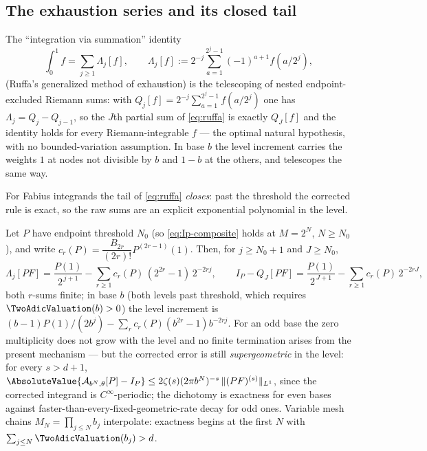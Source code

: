 \subsection{The exhaustion series and its closed tail}

The ``integration via summation'' identity
\begin{equation}
 \int_0^1f=\sum_{j\ge1}\Lambda_j[f],
 \qquad
 \Lambda_j[f]:=2^{-j}\sum_{a=1}^{2^{j}-1}(-1)^{a+1}f(a/2^{j}),
 \label{eq:ruffa}
\end{equation}
(Ruffa's generalized method of exhaustion) is the telescoping of
nested endpoint-excluded Riemann sums: with
$Q_j[f]=2^{-j}\sum_{a=1}^{2^{j}-1}f(a/2^{j})$ one has
$\Lambda_j=Q_j-Q_{j-1}$, so the $J$th partial sum of \eqref{eq:ruffa}
is exactly $Q_J[f]$ and the identity holds for every Riemann-integrable
$f$ --- the optimal natural hypothesis, with no bounded-variation
assumption.  In base $b$ the level increment carries the weights $1$ at
nodes not divisible by $b$ and $1-b$ at the others, and telescopes the
same way.

For Fabius integrands the tail of \eqref{eq:ruffa} \emph{closes}: past
the threshold the corrected rule is exact, so the raw sums are an
explicit exponential polynomial in the level.

\begin{theorem}
\label{thm:ruffa-tail}
Let $P$ have endpoint threshold $N_0$ (so
\eqref{eq:Ip-composite} holds at $M=2^{N}$, $N\ge N_0$), and write
$c_r(P)=\dfrac{B_{2r}}{(2r)!}P^{(2r-1)}(1)$.  Then, for $j\ge N_0+1$
and $J\ge N_0$,
\begin{equation}
 \Lambda_j[PF]
 =\frac{P(1)}{2^{\,j+1}}
 -\sum_{r\ge1}c_r(P)\,(2^{2r}-1)\,2^{-2rj},
 \qquad
 I_P-Q_J[PF]
 =\frac{P(1)}{2^{\,J+1}}-\sum_{r\ge1}c_r(P)\,2^{-2rJ},
 \label{eq:closed-tail}
\end{equation}
both $r$-sums finite; in base $b$ (both levels past threshold, which
requires $\TwoAdicValuation(b)>0$) the level increment is
$(b-1)P(1)/(2b^{j})-\sum_rc_r(P)(b^{2r}-1)b^{-2rj}$.  For an odd base
the zero multiplicity does not grow with the level and no finite
termination arises from the present mechanism --- but the corrected
error is still \emph{supergeometric} in the level: for every
$s>d+1$,
$\AbsoluteValue{\mathcal A_{b^{N},\theta}[P]-I_P}
\le 2\zeta(s)(2\pi b^{N})^{-s}\,\lVert(PF)^{(s)}\rVert_{L^1}$,
since the corrected integrand is $C^\infty$-periodic; the dichotomy
is exactness for even bases against
faster-than-every-fixed-geometric-rate decay for odd ones.  Variable
mesh chains $M_N=\prod_{j\le N}b_j$ interpolate: exactness begins at
the first $N$ with $\sum_{j\le N}\TwoAdicValuation(b_j)>d$.
\end{theorem}

